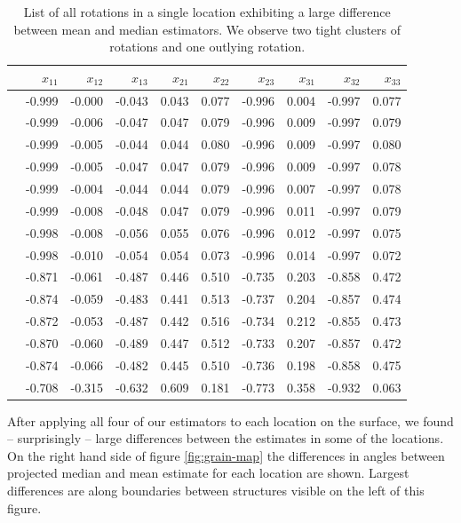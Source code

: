 {%
\begin{table}[ht]
\caption{\label{tab:rotations} List of all rotations in a single location exhibiting a large difference between mean and median estimators. We observe two tight clusters of rotations and one outlying rotation. }
\begin{center}
\begin{tabular}{rrrrrrrrrr}
  \hline
 & $x_{11}$ & $x_{12}$& $x_{13}$& $x_{21}$& $x_{22}$& $x_{23}$& $x_{31}$& $x_{32}$& $x_{33}$ \\ 
  \hline
   & -0.999 & -0.000 & -0.043 & 0.043 & 0.077 & -0.996 & 0.004 & -0.997 & 0.077 \\ 
   & -0.999 & -0.006 & -0.047 & 0.047 & 0.079 & -0.996 & 0.009 & -0.997 & 0.079 \\ 
   & -0.999 & -0.005 & -0.044 & 0.044 & 0.080 & -0.996 & 0.009 & -0.997 & 0.080 \\ 
   & -0.999 & -0.005 & -0.047 & 0.047 & 0.079 & -0.996 & 0.009 & -0.997 & 0.078 \\ 
   & -0.999 & -0.004 & -0.044 & 0.044 & 0.079 & -0.996 & 0.007 & -0.997 & 0.078 \\ 
   & -0.999 & -0.008 & -0.048 & 0.047 & 0.079 & -0.996 & 0.011 & -0.997 & 0.079 \\ 
   & -0.998 & -0.008 & -0.056 & 0.055 & 0.076 & -0.996 & 0.012 & -0.997 & 0.075 \\ 
   & -0.998 & -0.010 & -0.054 & 0.054 & 0.073 & -0.996 & 0.014 & -0.997 & 0.072 \\ [5pt]
   & -0.871 & -0.061 & -0.487 & 0.446 & 0.510 & -0.735 & 0.203 & -0.858 & 0.472 \\ 
   & -0.874 & -0.059 & -0.483 & 0.441 & 0.513 & -0.737 & 0.204 & -0.857 & 0.474 \\ 
   & -0.872 & -0.053 & -0.487 & 0.442 & 0.516 & -0.734 & 0.212 & -0.855 & 0.473 \\ 
   & -0.870 & -0.060 & -0.489 & 0.447 & 0.512 & -0.733 & 0.207 & -0.857 & 0.472 \\ 
   & -0.874 & -0.066 & -0.482 & 0.445 & 0.510 & -0.736 & 0.198 & -0.858 & 0.475 \\ [5pt] 
 & -0.708 & -0.315 & -0.632 & 0.609 & 0.181 & -0.773 & 0.358 & -0.932 & 0.063 \\ 
   \hline
\end{tabular}
\end{center}
\end{table}

After applying all four of our estimators to each location on the surface, we found -- surprisingly -- large differences between the estimates in some of the locations. On the right hand side of figure \ref{fig:grain-map} the differences in angles between projected median and mean estimate for each location are shown. Largest differences are along boundaries between structures visible on the left of this figure.

}
